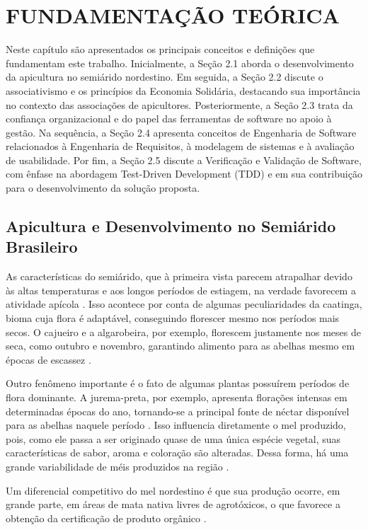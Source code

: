 \chapter{FUNDAMENTAÇÃO TEÓRICA}

Neste capítulo são apresentados os principais conceitos e definições que fundamentam este trabalho. Inicialmente, a Seção 2.1 aborda o desenvolvimento da apicultura no semiárido nordestino. Em seguida, a Seção 2.2 discute o associativismo e os princípios da Economia Solidária, destacando sua importância no contexto das associações de apicultores. Posteriormente, a Seção 2.3 trata da confiança organizacional e do papel das ferramentas de software no apoio à gestão. Na sequência, a Seção 2.4 apresenta conceitos de Engenharia de Software relacionados à Engenharia de Requisitos, à modelagem de sistemas e à avaliação de usabilidade. Por fim, a Seção 2.5 discute a Verificação e Validação de Software, com ênfase na abordagem Test-Driven Development (TDD) e em sua contribuição para o desenvolvimento da solução proposta.


\section{Apicultura e Desenvolvimento no Semiárido Brasileiro}
	
As características do semiárido, que à primeira vista parecem atrapalhar devido às altas temperaturas e aos longos períodos de estiagem, na verdade favorecem a atividade apícola \cite{khan2009desempenho, marreiro2025apicultura}. Isso acontece por conta de algumas peculiaridades da caatinga, bioma cuja flora é adaptável, conseguindo florescer mesmo nos períodos mais secos. O cajueiro e a algarobeira, por exemplo, florescem justamente nos meses de seca, como outubro e novembro, garantindo alimento para as abelhas mesmo em épocas de escassez \cite{khan2009desempenho}.

Outro fenômeno importante é o fato de algumas plantas possuírem períodos de flora dominante. A jurema-preta, por exemplo, apresenta florações intensas em determinadas épocas do ano, tornando-se a principal fonte de néctar disponível para as abelhas naquele período \cite{araujo2024}. Isso influencia diretamente o mel produzido, pois, como ele passa a ser originado quase de uma única espécie vegetal, suas características de sabor, aroma e coloração são alteradas. Dessa forma, há uma grande variabilidade de méis produzidos na região \cite{veras2025}.

Um diferencial competitivo do mel nordestino é que sua produção ocorre, em grande parte, em áreas de mata nativa livres de agrotóxicos, o que favorece a obtenção da certificação de produto orgânico \cite{barbosa2020}.

